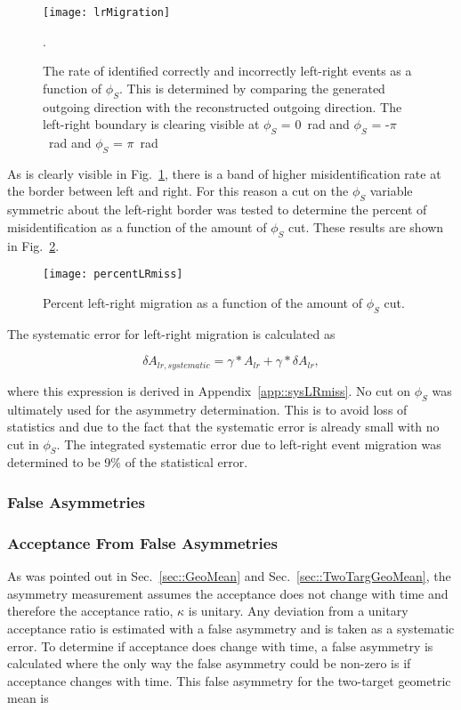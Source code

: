 \begin{figure}[h!t]
  \centering
  \texttt{[image: lrMigration]}
  \caption{The rate of identified correctly and incorrectly left-right events as
    a function of $\phi_{S}$.  This is determined by comparing the generated
    outgoing direction with the reconstructed outgoing direction.  The
    left-right boundary is clearing visible at $\phi_{S}$ = 0~rad and $\phi_{S}$
    = -$\pi$~rad and $\phi_{S}$ = $\pi$~rad}.
  \label{fig::lrMigration}
\end{figure}

\noindent
As is clearly visible in Fig.~\ref{fig::lrMigration}, there is a band of higher
misidentification rate at the border between left and right.  For this reason a
cut on the $\phi_{S}$ variable symmetric about the left-right border was tested
to determine the percent of misidentification as a function of the amount of
$\phi_{S}$ cut.  These results are shown in Fig.~\ref{fig::percentLRmiss}.

\begin{figure}[h!t]
  \centering \texttt{[image: percentLRmiss]}
  \caption{Percent left-right migration as a function of the amount of
    $\phi_{S}$ cut.}
    \label{fig::percentLRmiss}
\end{figure}

The systematic error for left-right migration is calculated as

\begin{equation}
  \delta A_{lr,systematic} = \gamma *A_{lr} + \gamma *\delta A_{lr},
\end{equation}

\noindent
where this expression is derived in Appendix~\ref{app::sysLRmiss}.  No cut on
$\phi_{S}$ was ultimately used for the asymmetry determination.  This is to
avoid loss of statistics and due to the fact that the systematic error is
already small with no cut in $\phi_{S}$.  The integrated systematic error due to
left-right event migration was determined to be 9\% of the statistical error.


\subsubsection{False Asymmetries}
\subsubsection{Acceptance From False Asymmetries}
As was pointed out in Sec.~\ref{sec::GeoMean} and
Sec.~\ref{sec::TwoTargGeoMean}, the asymmetry measurement assumes the acceptance
does not change with time and therefore the acceptance ratio, $\kappa$ is
unitary.  Any deviation from a unitary acceptance ratio is estimated with a
false asymmetry and is taken as a systematic error.  To determine if acceptance
does change with time, a false asymmetry is calculated where the only way the
false asymmetry could be non-zero is if acceptance changes with time.  This
false asymmetry for the two-target geometric mean is

